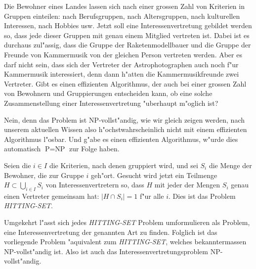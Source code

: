 Die Bewohner eines Landes lassen sich nach einer grossen Zahl
von Kriterien in Gruppen einteilen: nach Berufsgruppen, nach
Altersgruppen, nach kulturellen Interessen, nach Hobbies usw.
Jetzt soll eine Interessenvertretung gebildet werden so, dass
jede dieser Gruppen mit genau einem Mitglied vertreten ist.
Dabei ist es durchaus zul"assig, dass die Gruppe der Raketenmodellbauer
und die Gruppe der Freunde von Kammermusik von der gleichen Person
vertreten werden. Aber es darf nicht sein, dass sich der Vertreter
der Astrophotographen auch noch f"ur Kammermusik interessiert, denn
dann h"atten die Kammermusikfreunde zwei Vertreter.
Gibt es einen effizienten Algorithmus, der auch bei einer grossen
Zahl von Bewohnern und Gruppierungen entscheiden kann, ob eine
solche Zusammenstellung einer Interessenvertretung "uberhaupt
m"oglich ist?

\begin{loesung}
Nein, denn das Problem ist NP-vollst"andig, wie wir gleich
zeigen werden, nach unserem aktuellen
Wissen also h"ochstwahrscheinlich nicht mit einem effizienten
Algorithmus l"osbar. Und g"abe es einen effizienten Algorithmus,
w"urde dies automatisch $\text{P}=\text{NP}$ zur Folge haben.

Seien die $i\in I$ die Kriterien, nach denen gruppiert wird,
und sei $S_i$ die Menge der Bewohner, die zur Gruppe $i$ geh"ort.
Gesucht wird jetzt ein Teilmenge $H\subset\bigcup_{i\in I}S_i$
von Interessenvertretern so, dass $H$ mit jeder der Mengen
$S_i$ genau einen Vertreter gemeinsam hat: $|H\cap S_i|=1$
f"ur alle $i$. Dies ist das Problem {\textsl{HITTING-SET}}. 

Umgekehrt l"asst sich jedes {\textsl{HITTING-SET}} Problem umformulieren
als Problem, eine Interessenvertretung der genannten Art zu finden.
Folglich ist das vorliegende Problem "aquivalent zum {\textsl{HITTING-SET}},
welches bekanntermassen NP-vollst"andig ist. Also ist auch das
Interessenvertretungsproblem NP-vollst"andig.
\end{loesung}
